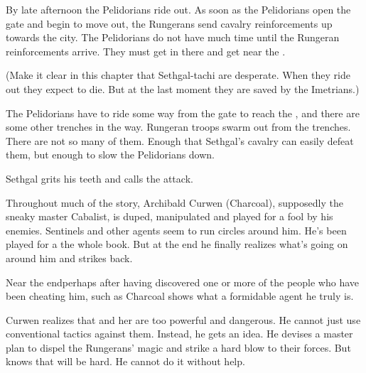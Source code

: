 \begin{comment}
  \subsection{Sethgal faces Rungerans in trenches}
\end{comment}
\new
By late afternoon the Pelidorians ride out. 
As soon as the Pelidorians open the gate and begin to move out, the Rungerans send cavalry reinforcements up towards the city. 
The Pelidorians do not have much time until the Rungeran reinforcements arrive.
They must get in there and get near the \ishrah. 

(Make it clear in this chapter that Sethgal-tachi are desperate. 
 When they ride out they expect to die.
 But at the last moment they are saved by the Imetrians.)

The Pelidorians have to ride some way from the gate to reach the \ishrah, and there are some other trenches in the way. 
Rungeran troops swarm out from the trenches. 
There are not so many of them. 
Enough that Sethgal's cavalry can easily defeat them, but enough to slow the Pelidorians down. 

Sethgal grits his teeth and calls the attack. 




\begin{comment}
  \subsection{Curwen goes to the Ghost Tower}
\end{comment}
\new
{}
Throughout much of the story, Archibald Curwen (Charcoal), supposedly the sneaky master Cabalist, is duped, manipulated and played for a fool by his enemies. Sentinels and other agents seem to run circles around him. 
He's been played for a  the whole book. 
But at the end he finally realizes what's going on around him and strikes back. 

Near the end\dash perhaps after having discovered one or more of the people who have been cheating him, such as \Sanyor{}\dash Charcoal shows what a formidable agent he truly is. 

Curwen realizes that \Takestsha and her \ishrah are too powerful and dangerous.
He cannot just use conventional tactics against them.
Instead, he gets an idea. 
He devises a master plan to dispel the Rungerans' \EreshKali magic and strike a hard blow to their forces. 
But knows that will be hard. 
He cannot do it without help. 

